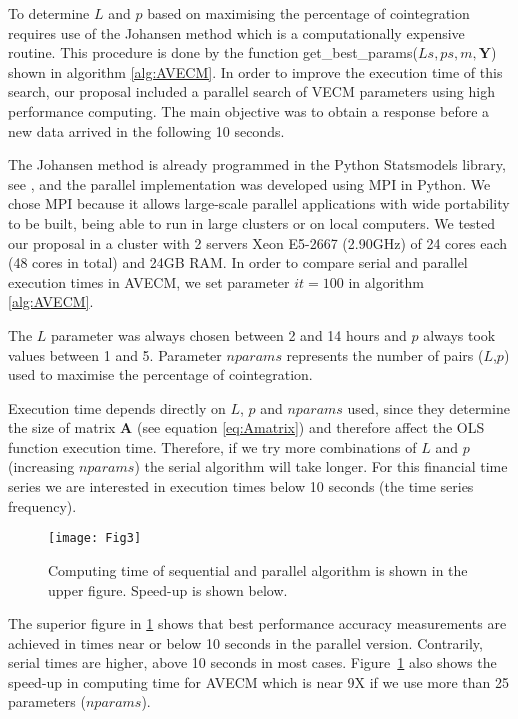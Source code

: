 To determine $L$ and $p$ based on maximising the percentage of cointegration
requires use of the Johansen method which is a computationally expensive
routine. This procedure is done by the function
get\_best\_params($Ls,ps,m,\mathbf{Y}$) shown in algorithm \ref{alg:AVECM}.  In
order to improve the execution time of this search, our proposal included a
parallel search of VECM parameters using high performance computing.  The main
objective was to obtain a response before a new data arrived in the following 10
seconds.

The Johansen method is already programmed in the Python Statsmodels
library, see \cite{seabold2010}, and the parallel implementation was developed using
MPI in Python.  We chose MPI because it allows large-scale parallel applications
with wide portability to be built, being able to run in large clusters or on
local computers.  We tested our proposal in a cluster with 2 servers Xeon
E5-2667 (2.90GHz) of 24 cores each (48 cores in total) and 24GB RAM.  In order
to compare serial and parallel execution times in AVECM, we set parameter
$it=100$ in algorithm \ref{alg:AVECM}.

The $L$ parameter was always chosen between 2 and 14 hours and $p$ always took
values between 1 and 5. Parameter $nparams$ represents the number of pairs
($L$,$p$) used to maximise the percentage of cointegration. 

Execution time depends directly on $L$, $p$ and $nparams$ used, since they
determine the size of matrix $\mathbf{A}$ (see equation \ref{eq:Amatrix}) and
therefore affect the OLS function execution time.  Therefore, if we try more
combinations of $L$ and $p$ (increasing $nparams$) the serial algorithm will
take longer. For this financial time series we are interested in execution times
below 10 seconds  (the time series frequency).

\begin{figure}[ht]
  \centering
  \texttt{[image: Fig3]}
  \caption{Computing time of sequential and parallel algorithm is shown in the
  upper figure. Speed-up is shown below.}
  \label{fig:extimes}
\end{figure}

The superior figure in \ref{fig:extimes} shows that best performance accuracy
measurements are achieved in times near or below 10 seconds in the parallel
version. Contrarily, serial times are higher, above 10 seconds in most cases.
Figure~\ref{fig:extimes} also shows the speed-up in computing time for AVECM
which is near 9X if we use more than 25 parameters ($nparams$).

